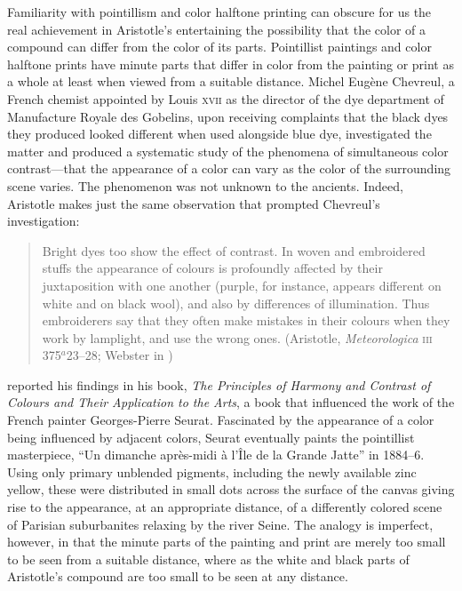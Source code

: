 Familiarity with pointillism and color halftone printing can obscure for us the real achievement in Aristotle's entertaining the possibility that the color of a compound can differ from the color of its parts. Pointillist paintings and color halftone prints have minute parts that differ in color from the painting or print as a whole at least when viewed from a suitable distance. Michel Eugène Chevreul, a French chemist appointed by Louis \textsc{xvii} as the director of the dye department of Manufacture Royale des Gobelins, upon receiving complaints that the black dyes they produced looked different when used alongside blue dye, investigated the matter and produced a systematic study of the phenomena of simultaneous color contrast---that the appearance of a color can vary as the color of the surrounding scene varies. The phenomenon was not unknown to the ancients. Indeed, Aristotle makes just the same observation that prompted Chevreul's investigation: 
\begin{quote}
	Bright dyes too show the effect of contrast. In woven and embroidered stuffs the appearance of colours is profoundly affected by their juxtaposition with one another (purple, for instance, appears different on white and on black wool), and also by differences of illumination. Thus embroiderers say that they often make mistakes in their colours when they work by lamplight, and use the wrong ones. (Aristotle, \emph{Meteorologica} \textsc{iii} 375\( ^{a} \)23--28; Webster in \citealt[61]{Barnes:1984uq})
\end{quote}
\citet{Chevreul:1855kx} reported his findings in his book, \emph{The Principles of Harmony and Contrast of Colours and Their Application to the Arts}, a book that influenced the work of the French painter Georges-Pierre Seurat. Fascinated by the appearance of a color being influenced by adjacent colors, Seurat eventually paints the pointillist masterpiece, “Un dimanche après-midi à l'Île de la Grande Jatte” in 1884--6. Using only primary unblended pigments, including the newly available zinc yellow, these were distributed in small dots across the surface of the canvas giving rise to the appearance, at an appropriate distance, of a differently colored scene of Parisian suburbanites relaxing by the river Seine. The analogy is imperfect, however, in that the minute parts of the painting and print are merely too small to be seen from a suitable distance, where as the white and black parts of Aristotle's compound are too small to be seen at any distance.



